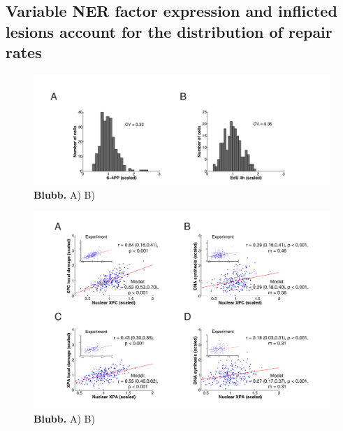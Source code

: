 \subsection{Variable NER factor expression and inflicted lesions account for the distribution of repair rates} 
\label{sec:variabilityAnalysis}
\begin{figure}[htbp]
	\begin{center}
		\includegraphics[width=1\textwidth]{Abbildungen/figure3_5.pdf}
		\caption{\textbf{Blubb.} A) B) }
		\label{fig:DamageDist}
	\end{center}
\end{figure}

\begin{figure}[htbp]
	\begin{center}
		\includegraphics[width=1\textwidth]{Abbildungen/figure3_6.pdf}
		\caption{\textbf{Blubb.} A) B) }
		\label{fig:Model_dataComp}
	\end{center}
\end{figure}

